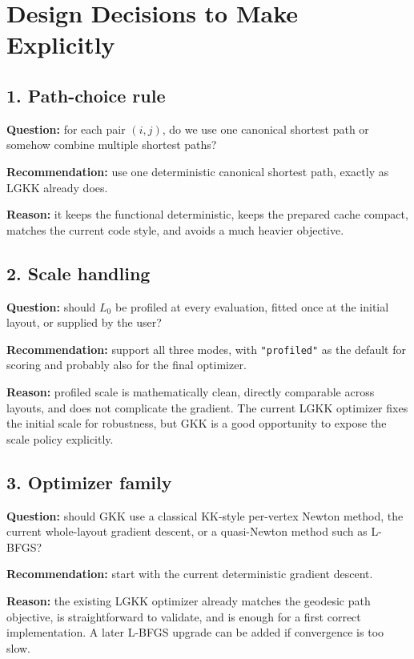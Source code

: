 \documentclass[11pt]{article}
\begin{document}
\section{Design Decisions to Make Explicitly}

\subsection*{1. Path-choice rule}

\textbf{Question:} for each pair $(i,j)$, do we use one canonical shortest path
or somehow combine multiple shortest paths?

\textbf{Recommendation:} use one deterministic canonical shortest path, exactly
as LGKK already does.

\textbf{Reason:} it keeps the functional deterministic, keeps the prepared cache
compact, matches the current code style, and avoids a much heavier objective.

\subsection*{2. Scale handling}

\textbf{Question:} should $L_0$ be profiled at every evaluation, fitted once at
the initial layout, or supplied by the user?

\textbf{Recommendation:} support all three modes, with \texttt{"profiled"} as the
default for scoring and probably also for the final optimizer.

\textbf{Reason:} profiled scale is mathematically clean, directly comparable
across layouts, and does not complicate the gradient. The current LGKK optimizer
fixes the initial scale for robustness, but GKK is a good opportunity to expose
the scale policy explicitly.

\subsection*{3. Optimizer family}

\textbf{Question:} should GKK use a classical KK-style per-vertex Newton method,
the current whole-layout gradient descent, or a quasi-Newton method such as
L-BFGS?

\textbf{Recommendation:} start with the current deterministic gradient descent.

\textbf{Reason:} the existing LGKK optimizer already matches the geodesic path
objective, is straightforward to validate, and is enough for a first correct
implementation. A later L-BFGS upgrade can be added if convergence is too slow.
\end{document}
